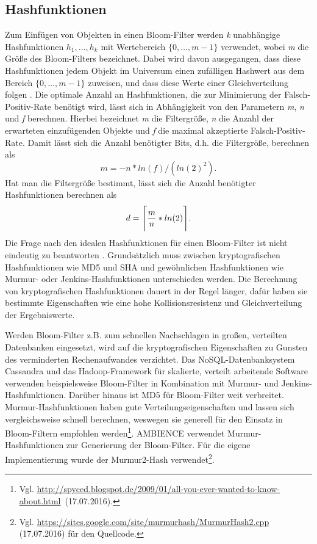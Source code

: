 \subsection{Hashfunktionen}\label{sec:hashfunktionen}
Zum Einfügen von Objekten in einen Bloom-Filter werden \textit{k} unabhängige Hashfunktionen $h_1,\ldots , h_k$ mit Wertebereich $\{ 0,\ldots, m-1\}$ verwendet, wobei \textit{m} die Größe des Bloom-Filters bezeichnet. Dabei wird davon ausgegangen, dass diese Hashfunktionen jedem Objekt im Universum einen zufälligen Hashwert aus dem Bereich $\{ 0,\ldots, m-1\}$ zuweisen, und dass diese Werte einer Gleichverteilung folgen \cite{Mitzenmacher2002}. Die optimale Anzahl an Hashfunktionen, die zur Minimierung der Falsch-Positiv-Rate benötigt wird, lässt sich in Abhängigkeit von den Parametern \textit{m}, \textit{n} und \textit{f} berechnen. Hierbei bezeichnet \textit{m} die Filtergröße, \textit{n} die Anzahl der erwarteten einzufügenden Objekte und \textit{f} die maximal akzeptierte Falsch-Positiv-Rate. Damit lässt sich die Anzahl benötigter Bits, d.h. die Filtergröße, berechnen als
\[m = -n\ast ln(f) / (ln(2)^2).\]
Hat man die Filtergröße bestimmt, lässt sich die Anzahl benötigter Hashfunktionen berechnen als 
\[d = \Ceil[\Bigg]{\frac{m}{n}\ast ln(2)}.\]
Die Frage nach den idealen Hashfunktionen für einen Bloom-Filter ist nicht eindeutig zu beantworten \cite{Broder2004}. Grundsätzlich muss zwischen kryptografischen Hashfunktionen wie MD5 und SHA und gewöhnlichen Hashfunktionen wie Murmur- oder Jenkins-Hashfunktionen unterschieden werden. Die Berechnung von kryptografischen Hashfunktionen dauert in der Regel länger, dafür haben sie bestimmte Eigenschaften wie eine hohe Kollisionsresistenz und Gleichverteilung der Ergebniswerte. 

Werden Bloom-Filter z.B. zum schnellen Nachschlagen in großen, verteilten Datenbanken eingesetzt, wird auf die kryptografischen Eigenschaften zu Gunsten des verminderten Rechenaufwandes verzichtet. Das NoSQL-Datenbanksystem Cassandra und das Hadoop-Framework für skalierte, verteilt arbeitende Software verwenden beispielsweise Bloom-Filter in Kombination mit Murmur- und Jenkins-Hashfunktionen. Darüber hinaus ist MD5 für Bloom-Filter weit verbreitet. Murmur-Hashfunktionen haben gute Verteilungseigenschaften und lassen sich vergleichsweise schnell berechnen, weswegen sie generell für den Einsatz in Bloom-Filtern empfohlen werden\footnote{Vgl. \mbox{\url{http://spyced.blogspot.de/2009/01/all-you-ever-wanted-to-know-about.html} (17.07.2016).}}. AMBIENCE verwendet Murmur-Hashfunktionen zur Generierung der Bloom-Filter. Für die eigene Implementierung wurde der Murmur2-Hash verwendet\footnote{Vgl. \url{https://sites.google.com/site/murmurhash/MurmurHash2.cpp} (17.07.2016) für den Quellcode.}.  
